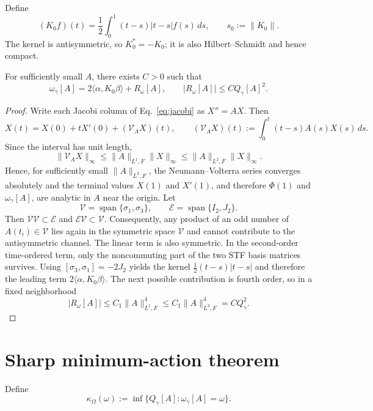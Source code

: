 \begin{definition}
Define
\begin{equation}
(K_0f)(t)=\frac12\int_0^1(t-s)|t-s|f(s)\,ds,
\qquad s_0:=\|K_0\|.
\label{eq:K0}
\end{equation}
The kernel is antisymmetric, so $K_0^*=-K_0$; it is also Hilbert--Schmidt and hence compact.
\end{definition}

\begin{lemma}
\label{lem:endpoint-expansion}
For sufficiently small $A$, there exists $C>0$ such that
\begin{equation}
\omega_\gamma[A]=2\langle\alpha,K_0\beta\rangle+R_\omega[A],
\qquad |R_\omega[A]|\le C Q_\gamma[A]^2.
\label{eq:endpoint-expansion}
\end{equation}
\end{lemma}
\begin{proof}
Write each Jacobi column of Eq.~\eqref{eq:jacobi} as $X''=AX$. Then
\[
X(t)=X(0)+tX'(0)+(\mathcal V_A X)(t),\qquad
(\mathcal V_A X)(t):=\int_0^t(t-s)A(s)X(s)\,ds.
\]
Since the interval has unit length,
\[
\|\mathcal V_A X\|_\infty
\le \|A\|_{L^1,F}\|X\|_\infty
\le \|A\|_{L^2,F}\|X\|_\infty.
\]
Hence, for sufficiently small $\|A\|_{L^2,F}$, the Neumann--Volterra series converges absolutely and the terminal values $X(1)$ and $X'(1)$, and therefore $\Phi(1)$ and $\omega_\gamma[A]$, are analytic in $A$ near the origin. Let
\[
\mathcal V=\operatorname{span}\{\sigma_1,\sigma_3\},\qquad
\mathcal E=\operatorname{span}\{I_2,J_2\}.
\]
Then $\mathcal V\mathcal V\subset\mathcal E$ and $\mathcal E\mathcal V\subset\mathcal V$. Consequently, any product of an odd number of $A(t_i)\in\mathcal V$ lies again in the symmetric space $\mathcal V$ and cannot contribute to the antisymmetric channel. The linear term is also symmetric. In the second-order time-ordered term, only the noncommuting part of the two STF basis matrices survives. Using $[\sigma_3,\sigma_1]=-2J_2$ yields the kernel $\frac12(t-s)|t-s|$ and therefore the leading term $2\langle\alpha,K_0\beta\rangle$. The next possible contribution is fourth order, so in a fixed neighborhood
\[
|R_\omega[A]|\le C_1\|A\|_{L^1,F}^4
\le C_1\|A\|_{L^2,F}^4
=C Q_\gamma^2.
\]
\end{proof}

\section{Sharp minimum-action theorem}
Define
\begin{equation}
\kappa_\Omega(\omega):=\inf\{Q_\gamma[A]:\omega_\gamma[A]=\omega\}.
\label{eq:value}
\end{equation}

